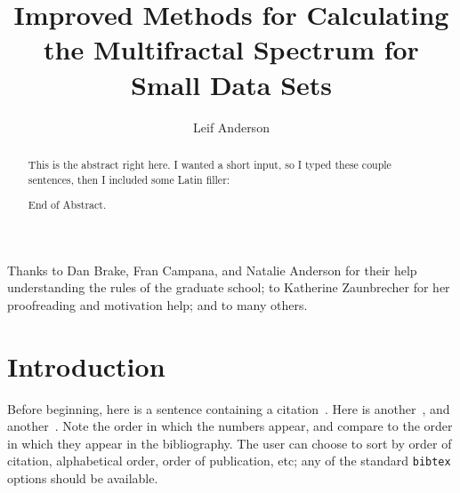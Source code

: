 \documentclass[draft, masters]{csuthesis} %
\title[Improved Multifractal Calculations]{Improved Methods for Calculating the Multifractal Spectrum for Small Data Sets}
\author{Leif Anderson}
\begin{document}
\frontmatter

% 
\begin{abstract}
This is the abstract right here. I wanted a short input, so I typed these couple sentences, then I included some Latin filler: \lipsum[1-4]

End of Abstract.
\end{abstract}

\begin{acknowledgements}
Thanks to Dan Brake, Fran Campana, and Natalie Anderson for their help understanding the rules of the graduate school; to Katherine Zaunbrecher for her proofreading and motivation help; and to many others.
\end{acknowledgements}%

\maketitle


\tableofcontents %
\listoftables %
\listoffigures %

\mainmatter %
\chapter{Introduction}

Before beginning, here is a sentence containing a citation~\cite{multifrac}.  Here is another~\cite{ebalett}, and another~\cite{corrdim}.  Note the order in which the numbers appear, and compare to the order in which they appear in the bibliography.  The user can choose to sort by order of citation, alphabetical order, order of publication, etc; any of the standard \verb-bibtex- options should be available.
\end{document}
